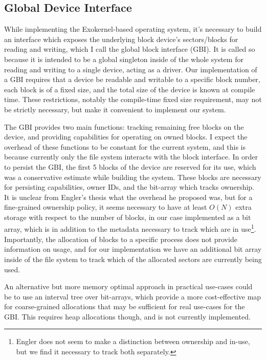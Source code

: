 \documentclass[letterpaper,twocolumn,10pt]{article}
\begin{document}
\subsection{Global Device Interface}\label{sec:gbi}

While implementing the Exokernel-based operating system, it's necessary to build an interface
which exposes the underlying block device's sectors/blocks for reading and writing, which I call
the global block interface (GBI). It is called so because it is intended to be a global
singleton inside of the whole system for reading and writing to a single device, acting as a
driver. Our implementation of a GBI requires that a device be readable and writable to a
specific block number, each block is of a fixed size, and the total size of the device is known
at compile time. These restrictions, notably the compile-time fixed size requirement, may not be
strictly necessary, but make it convenient to implement our system.

The GBI provides two main functions: tracking remaining free blocks on the device, and providing
capabilities for operating on owned blocks. I expect the overhead of these functions to be
constant for the current system, and this is because currently only the file system interacts
with the block interface. In order to persist the GBI, the first 5 blocks of the device are
reserved for its use, which was a conservative estimate while building the system. These blocks
are necessary for persisting capabilities, owner IDs, and the bit-array which tracks ownership.
It is unclear from Engler's thesis what the overhead he proposed was, but for a fine-grained
ownership policy, it seems necessary to have at least $O(N)$ extra storage with respect to the
number of blocks, in our case implemented as a bit array, which is in addition to the metadata
necessary to track which are in use\footnote{Engler does not seem to make a distinction between
ownership and in-use, but we find it necessary to track both separately.}. Importantly, the
allocation of blocks to a specific process does not provide information on usage, and for our
implementation we have an additional bit array inside of the file system to track which of the
allocated sectors are currently being used.

An alternative but more memory optimal approach in practical use-cases could be to use an
interval tree over bit-arrays, which provide a more cost-effective map for coarse-grained
allocations that may be sufficient for real use-cases for the GBI. This requires heap
allocations though, and is not currently implemented.
\end{document}
